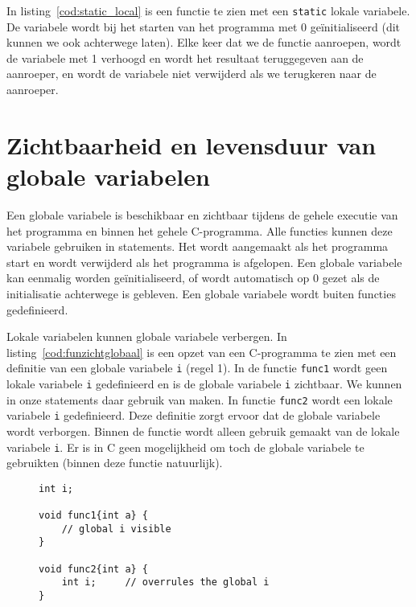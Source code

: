 In listing~\ref{cod:static_local} is een functie te zien met een \texttt{static} lokale variabele. De variabele wordt bij het starten van het programma met 0 geïnitialiseerd (dit kunnen we ook achterwege laten).
Elke keer dat we de functie aanroepen, wordt de variabele met 1 verhoogd en wordt het resultaat teruggegeven aan de aanroeper, en wordt de variabele niet verwijderd als we terugkeren naar de aanroeper.



\section{Zichtbaarheid en levensduur van globale variabelen}
Een globale variabele is beschikbaar en zichtbaar tijdens de gehele executie van het programma en binnen het gehele C-programma. Alle functies kunnen deze variabele gebruiken in statements. Het wordt aangemaakt als het programma start en wordt verwijderd als het programma is afgelopen. Een globale variabele kan eenmalig worden geïnitialiseerd, of wordt automatisch op 0 gezet als de initialisatie achterwege is gebleven. Een globale variabele wordt buiten functies gedefinieerd.

Lokale variabelen kunnen globale variabele verbergen. In listing~\ref{cod:funzichtglobaal} is een opzet van een C-programma te zien met een definitie van een globale variabele \texttt{i} (regel 1). In de functie \texttt{func1} wordt geen lokale variabele \texttt{i} gedefinieerd en is de globale variabele \texttt{i} zichtbaar. We kunnen in onze statements daar gebruik van maken. In functie \texttt{func2} wordt een lokale variabele \texttt{i} gedefinieerd. Deze definitie zorgt ervoor dat de globale variabele wordt verborgen. Binnen de functie wordt alleen gebruik gemaakt van de lokale variabele \texttt{i}. Er is in C geen mogelijkheid om toch de globale variabele te gebruikten (binnen deze functie natuurlijk).

\begin{figure}[!t]
\begin{lstlisting}[caption=Zichtbaarheid van globale variabelen.,label=cod:funzichtglobaal]
int i;

void func1{int a} {
    // global i visible
}

void func2{int a} {
    int i;     // overrules the global i
}
\end{lstlisting}
\end{figure}

